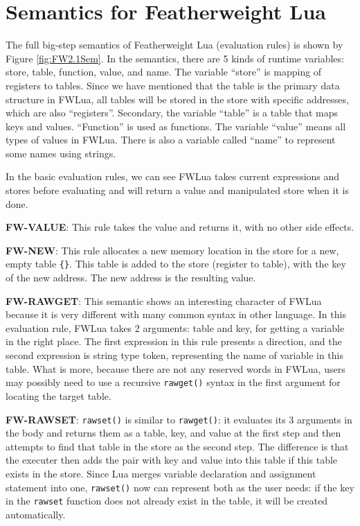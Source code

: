 \section{Semantics for Featherweight Lua}\label{sec: FWLUAsemantic}
The full big-step semantics of Featherweight Lua (evaluation rules) is shown by Figure \ref{fig:FW2.1Sem}. In the semantics, there are 5 kinds of runtime variables: store, table, function, value, and name. The variable ``store'' is mapping of registers to tables. Since we have mentioned that the table is the primary data structure in FWLua, all tables will be stored in the store with specific addresses, which are also ``registers''. Secondary, the variable ``table'' is a table that maps keys and values. ``Function'' is used as functions. The variable ``value'' means all types of values in FWLua. There is also a variable called ``name'' to represent some names using strings.

In the basic evaluation rules, we can see FWLua takes current expressions and stores before evaluating and will return a value and manipulated store when it is done.

{\bf FW-VALUE}: 
This rule takes the value and returns it, with no other side effects.

{\bf FW-NEW}: 
This rule allocates a new memory location in the store for a new, empty table {\tt \{\}}. This table is added to the store (register to table), with the key of the new address. The new address is the resulting value.

{\bf FW-RAWGET}: 
This semantic shows an interesting character of FWLua because it is very different with many common syntax in other language. In this evaluation rule, FWLua takes 2 arguments: table and key, for getting a variable in the right place. The first expression in this rule presents a direction, and the second expression is string type token, representing the name of variable in this table. What is more, because there are not any reserved words in FWLua, users may possibly need to use a recursive {\tt rawget()} syntax in the first argument for locating the target table.

{\bf FW-RAWSET}: 
{\tt rawset()} is similar to {\tt rawget()}: it evaluates its 3 arguments in the body and returns them as a table, key, and value at the first step and then attempts to find that table in the store as the second step. The difference is that the executer then adds the pair with key and value into this table if this table exists in the store. Since Lua merges variable declaration and assignment statement into one, {\tt rawset()} now can represent both as the user needs: if the key in the {\tt rawset} function does not already exist in the table, it will be created automatically.


